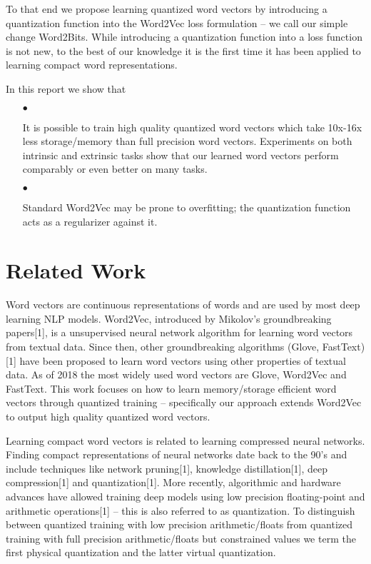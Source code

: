 \documentclass{article} %
\begin{document}
To that end we propose learning quantized word vectors by introducing
a quantization function into the Word2Vec loss formulation -- we call
our simple change Word2Bits. While introducing a quantization function
into a loss function is not new, to the best of our knowledge it is
the first time it has been applied to learning compact word representations.

In this report we show that
\begin{enumerate}
\item[$\bullet$]

  It is possible to train high quality quantized word vectors which
  take 10x-16x less storage/memory than full precision word
  vectors. Experiments on both intrinsic and extrinsic tasks show that
  our learned word vectors perform comparably or even better on many tasks.

\item[$\bullet$]

  Standard Word2Vec may be prone to overfitting; the quantization
  function acts as a regularizer against it.

\end{enumerate}

\section{Related Work}
Word vectors are continuous representations of words and are used by
most deep learning NLP models. Word2Vec, introduced by Mikolov's
groundbreaking papers[1], is a unsupervised neural network algorithm for
learning word vectors from textual data. Since then, other
groundbreaking algorithms (Glove, FastText) [1] have been proposed to
learn word vectors using other properties of textual data. As of 2018
the most widely used word vectors are Glove, Word2Vec and
FastText. This work focuses on how to learn memory/storage efficient
word vectors through quantized training -- specifically our approach
extends Word2Vec to output high quality quantized word vectors.

Learning compact word vectors is related to learning compressed neural
networks. Finding compact representations of neural
networks date back to the 90's and include techniques like network
pruning[1], knowledge distillation[1], deep compression[1] and
quantization[1]. More recently, algorithmic and hardware advances have
allowed training deep models using low precision floating-point and
arithmetic operations[1] -- this is also referred to as
quantization. To distinguish between quantized training with low
precision arithmetic/floats from quantized training with full
precision arithmetic/floats but constrained values we term the first
physical quantization and the latter virtual quantization.
\end{document}
